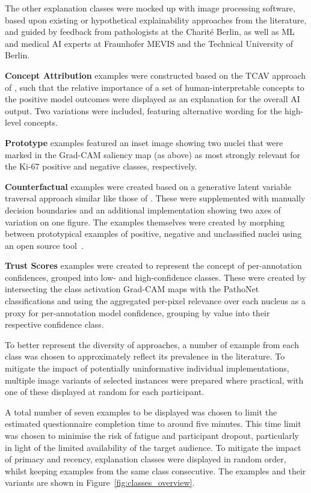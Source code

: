\documentclass[final,5p,times,twocolumn,hyphens]{elsarticle}
\begin{document}
The other explanation classes were mocked up with image processing software, based upon existing or hypothetical explainability approaches from the literature, and guided by feedback from pathologists at the Charité Berlin, as well as ML and medical AI experts at Fraunhofer MEVIS and the Technical University of Berlin.

\textbf{Concept Attribution} examples were constructed based on the TCAV approach of \citet{kim2018interpretability}, such that the relative importance of a set of human-interpretable concepts to the positive model outcomes were displayed as an explanation for the overall AI output. Two variations were included, featuring alternative wording for the high-level concepts. 

\textbf{Prototype} examples featured an inset image showing two nuclei that were marked in the Grad-CAM saliency map (as above) as most strongly relevant for the Ki-67 positive and negative classes, respectively.

\textbf{Counterfactual} examples were created based on a generative latent variable traversal approach similar like those of \citet{liu2019generative}. These were supplemented with manually decision boundaries and an additional implementation showing two axes of variation on one figure. The examples themselves were created by morphing between prototypical examples of positive, negative and unclassified nuclei using an open source tool~\cite{diffmorph:github}.

\textbf{Trust Scores} examples were created to represent the concept of per-annotation confidences, grouped into low- and high-confidence classes. These were created by intersecting the class activation Grad-CAM maps with the PathoNet classifications and using the aggregated per-pixel relevance over each nucleus as a proxy for per-annotation model confidence, grouping by value into their respective confidence class.

To better represent the diversity of approaches, a number of example from each class was chosen to approximately reflect its prevalence in the literature. To mitigate the impact of potentially uninformative individual implementations, multiple image variants of selected instances were prepared where practical, with one of these displayed at random for each participant. 

A total number of seven examples to be displayed was chosen to limit the estimated questionnaire completion time to around five minutes. This time limit was chosen to minimise the risk of fatigue and participant dropout, particularly in light of the limited availability of the target audience. To mitigate the impact of primacy and recency, explanation classes were displayed in random order, whilst keeping examples from the same class consecutive. The examples and their variants are shown in Figure~\ref{fig:classes_overview}.
\end{document}
